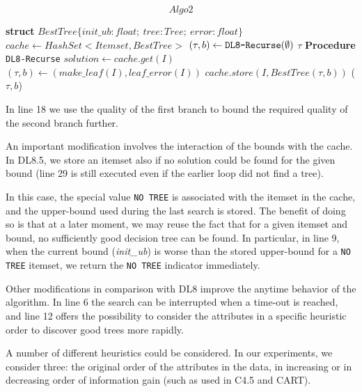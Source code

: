 $$Algo2
\label{algo:2}$$
\begin{algorithm}
	\DontPrintSemicolon
	\caption{$DL8.5(maxdepth, minsup)$}
	\label{algo:1}
	\textbf{struct} $BestTree\{init\_ub : float;\ tree: Tree;\ error : float\}$\;
	$cache \gets HashSet < Itemset, BestTree >$\;
	$(\tau, b) \gets \verb|DL8-Recurse|(\emptyset)$\;
	\Return $\tau$\;
	\textbf{Procedure} \texttt{DL8-Recurse}\;
	$solution \gets cache.get(I)$\;
	$(\tau, b) \gets (make\_leaf(I), leaf\_error (I))$\;
	$cache.store(I, BestT ree(\tau, b))$\;
	\Return($\tau, b$)\;
\end{algorithm}


In line 18 we use the quality of the first branch to bound the required quality of the second branch further.

An important modification involves the interaction of the bounds with the cache. In DL8.5, we store an itemset also if no solution could be found for the given bound (line 29 is still executed even if the earlier loop did not find a tree).

In this case, the special value \verb|NO TREE| is associated with the itemset in the cache, and the upper-bound used during the last search is stored. The benefit of doing so is that at a later moment, we may reuse the fact that for a given itemset and bound, no sufficiently good decision tree can be found. In particular, in line 9, when the current bound (\emph{init\_ub}) is worse than the stored upper-bound for a \verb|NO TREE| itemset, we return the \verb|NO TREE| indicator immediately.

Other modifications in comparison with DL8 improve the anytime behavior of the algorithm. In line 6 the search can be interrupted when a time-out is reached, and line 12 offers the possibility to consider the attributes in a specific heuristic order to discover good trees more rapidly.

A number of different heuristics could be considered. In our experiments, we consider three: the original order of the attributes in the data, in increasing or in decreasing order of information gain (such as used in C4.5 and CART).


